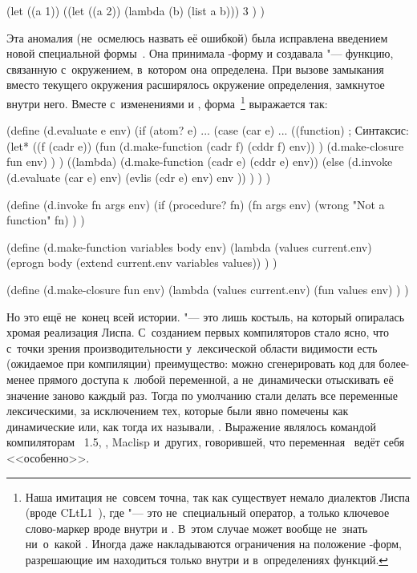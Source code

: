 \begin{code:lisp}
(let ((a 1))
  ((let ((a 2)) (lambda (b) (list a b)))
   3 ) )
\end{code:lisp}

Эта аномалия (не~осмелюсь назвать её ошибкой) была исправлена введением новой
специальной формы~. Она принимала -форму и создавала
 "--- функцию, связанную с~окружением, в~котором она определена.
При вызове замыкания вместо текущего окружения расширялось окружение
определения, замкнутое внутри него. Вместе с~изменениями  и
, форма~\footnote{Наша имитация не~совсем точна, так
как существует немало диалектов Лиспа (вроде CLtL1~\cite{ste84}), где
 "--- это не~специальный оператор, а только ключевое слово-маркер
вроде  внутри  и . В~этом случае 
может вообще не~знать ни~о~какой . Иногда даже накладываются
ограничения на положение -форм, разрешающие им находиться только
внутри  и в~определениях функций.} выражается так:

\begin{code:lisp}[label=basics/repr-func/dyn-and-lex-bind/src:closure-eval]
(define (d.evaluate e env)
  (if (atom? e) ...
      (case (car e)
        ...
        ((function)   ; Синтаксис: 
         (let* ((f   (cadr e))
                (fun (d.make-function (cadr f) (cddr f) env)) )
           (d.make-closure fun env) ) )
        ((lambda) (d.make-function (cadr e) (cddr e) env))
        (else     (d.invoke (d.evaluate (car e) env)
                            (evlis (cdr e) env)
                            env )) ) ) )

(define (d.invoke fn args env)
  (if (procedure? fn)
      (fn args env)
      (wrong "Not a function" fn) ) )

(define (d.make-function variables body env)
  (lambda (values current.env)
    (eprogn body (extend current.env variables values)) ) )

(define (d.make-closure fun env)
  (lambda (values current.env)
    (fun values env) ) )
\end{code:lisp}

Но это ещё не~конец всей истории.  "--- это лишь костыль, на
который опиралась хромая реализация Лиспа. С~созданием первых компиляторов стало
ясно, что с~точки зрения производительности у~лексической области видимости есть
(ожидаемое при компиляции) преимущество: можно сгенерировать код для более-менее
прямого доступа к~любой переменной, а не~динамически отыскивать её значение
заново каждый раз. Тогда по умолчанию стали делать все переменные лексическими,
за исключением тех, которые были явно помечены как динамические или, как тогда
их называли, . Выражение 
являлось командой компиляторам \LISP~1.5, \CommonLisp, Maclisp и~других,
говорившей, что переменная~ ведёт себя <<особенно>>.

